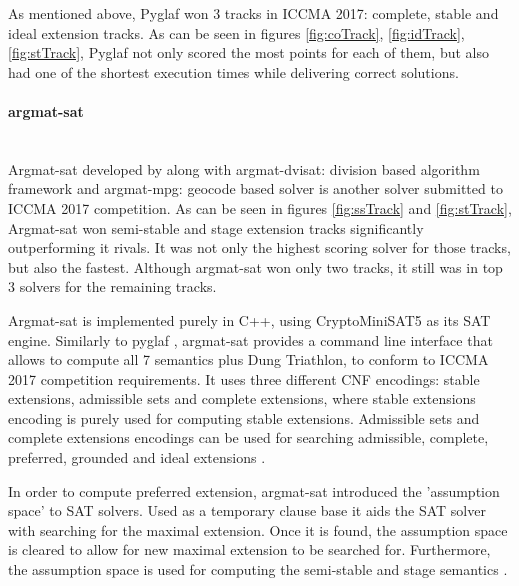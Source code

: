 As mentioned above, Pyglaf won 3 tracks in ICCMA 2017: complete, stable and ideal extension tracks. As can be seen in figures \ref{fig:coTrack}, \ref{fig:idTrack}, \ref{fig:stTrack}, Pyglaf not only scored the most points for each of them, but also had one of the shortest execution times while delivering correct solutions.

\paragraph{argmat-sat} \mbox{}\\
Argmat-sat developed by \citet{argmatSat} along with argmat-dvisat: division based algorithm framework \citep{argmatDvisat} and argmat-mpg: geocode based solver is another solver submitted to ICCMA 2017 competition. As can be seen in figures \ref{fig:ssTrack} and \ref{fig:stTrack}, Argmat-sat won semi-stable and stage extension tracks significantly outperforming it rivals. It was not only the highest scoring solver for those tracks, but also the fastest. Although argmat-sat won only two tracks, it still was in top 3 solvers for the remaining tracks.

Argmat-sat is implemented purely in C++, using CryptoMiniSAT5 \citep{CryptoMiniSat} as its SAT engine. Similarly to pyglaf \citep{pyglaf}, argmat-sat provides a command line interface that allows to compute all 7 semantics plus Dung Triathlon, to conform to ICCMA 2017 competition requirements. It uses three different CNF encodings: stable extensions, admissible sets and complete extensions, where stable extensions encoding is purely used for computing stable extensions. Admissible sets and complete extensions encodings can be used for searching admissible, complete, preferred, grounded and ideal extensions \citep{argmatSat}. 

In order to compute preferred extension, argmat-sat introduced the 'assumption space' to SAT solvers. Used as a temporary clause base it aids the SAT solver with searching for the maximal extension. Once it is found, the assumption space is cleared to allow for new maximal extension to be searched for. Furthermore, the assumption space is used for computing the semi-stable and stage semantics \citep{argmatSat}.


